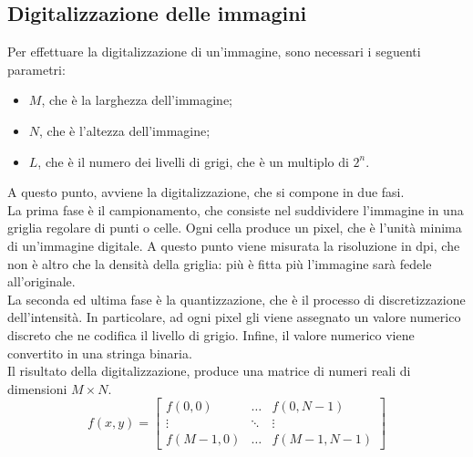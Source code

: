 \subsection{Digitalizzazione delle immagini}
Per effettuare la digitalizzazione di un'immagine, sono necessari i seguenti parametri:
\begin{itemize}
    \item $M$, che è la larghezza dell'immagine;
    \item $N$, che è l'altezza dell'immagine;
    \item $L$, che è il numero dei livelli di grigi, che è un multiplo di $2^n$.
\end{itemize}
A questo punto, avviene la digitalizzazione, che si compone in due fasi. \\La prima fase è il campionamento, che consiste nel suddividere l'immagine in una griglia regolare di punti o celle. Ogni cella produce un pixel, che è l'unità minima di un'immagine digitale. A questo punto viene misurata la risoluzione in dpi, che non è altro che la densità della griglia: più è fitta più l'immagine sarà fedele all'originale.\\
La seconda ed ultima fase è la quantizzazione, che è il processo di discretizzazione dell'intensità. In particolare, ad ogni pixel gli viene assegnato un valore numerico discreto che ne codifica il livello di grigio. Infine, il valore numerico viene convertito in una stringa binaria.\\
Il risultato della digitalizzazione, produce una matrice di numeri reali di dimensioni $M \times N$.
\[
f(x,y) = \begin{bmatrix}
f(0,0) & \dots & f(0, N-1) \\
\vdots & \ddots & \vdots \\
f(M-1,0) & \dots & f(M-1, N-1)
\end{bmatrix}
\]

